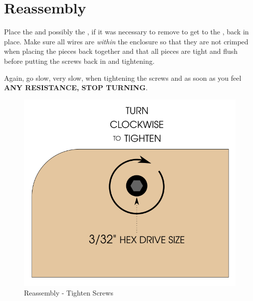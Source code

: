\section{Reassembly} \label{Reassembly}

Place the  and possibly the , if it was necessary to remove to
get to the , back in place.  Make sure all wires are \textit{within} the
enclosure so that they are not crimped when placing the pieces back together and
that all pieces are tight and flush before putting the screws back in and
tightening.

\par\medskip

Again, go slow, very slow, when tightening the screws and as soon as you feel
\textbf{ANY RESISTANCE, STOP TURNING}.


\begin{figure}[H]
\centering
  \includegraphics{images/disassembly_tighten.png}
\caption{Reassembly - Tighten Screws}
\end{figure}

